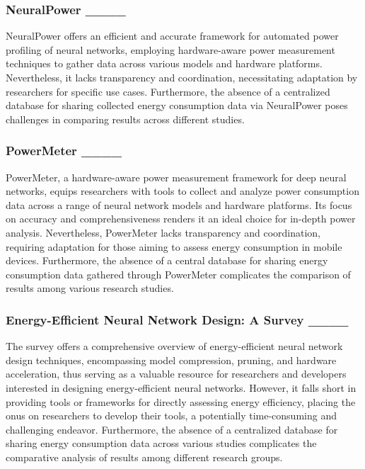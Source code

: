 \subsubsection{NeuralPower ____} NeuralPower offers an efficient and accurate framework for automated power profiling of neural networks, employing hardware-aware power measurement techniques to gather data across various models and hardware platforms. Nevertheless, it lacks transparency and coordination, necessitating adaptation by researchers for specific use cases. Furthermore, the absence of a centralized database for sharing collected energy consumption data via NeuralPower poses challenges in comparing results across different studies.

\subsubsection{PowerMeter ____} PowerMeter, a hardware-aware power measurement framework for deep neural networks, equips researchers with tools to collect and analyze power consumption data across a range of neural network models and hardware platforms. Its focus on accuracy and comprehensiveness renders it an ideal choice for in-depth power analysis. Nevertheless, PowerMeter lacks transparency and coordination, requiring adaptation for those aiming to assess energy consumption in mobile devices. Furthermore, the absence of a central database for sharing energy consumption data gathered through PowerMeter complicates the comparison of results among various research studies.

\subsubsection{Energy-Efficient Neural Network Design: A Survey ____} The survey offers a comprehensive overview of energy-efficient neural network design techniques, encompassing model compression, pruning, and hardware acceleration, thus serving as a valuable resource for researchers and developers interested in designing energy-efficient neural networks. However, it falls short in providing tools or frameworks for directly assessing energy efficiency, placing the onus on researchers to develop their tools, a potentially time-consuming and challenging endeavor. Furthermore, the absence of a centralized database for sharing energy consumption data across various studies complicates the comparative analysis of results among different research groups.


